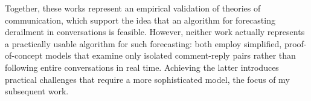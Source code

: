\documentclass[11pt,letterpaper]{article}
\begin{document}
Together, these works represent an empirical validation of theories of communication, which support the idea that an algorithm for forecasting derailment in conversations is feasible.
However, neither work actually represents a practically usable algorithm for such forecasting: both employ simplified, proof-of-concept models that examine only isolated comment-reply pairs rather than following entire conversations in real time.
Achieving the latter introduces practical challenges that require a more sophisticated model, the focus of my subsequent work.

\vspace{\baselineskip}


\end{document}
